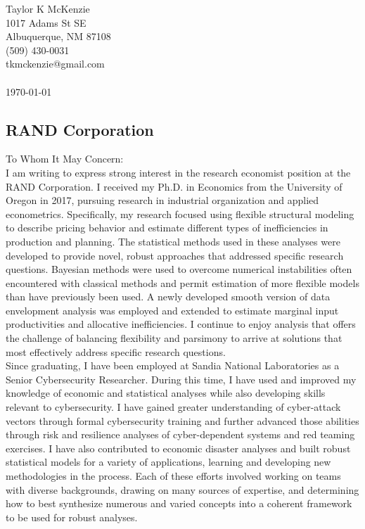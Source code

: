 \documentclass[]{article}
\begin{document}
\thispagestyle{empty}

\noindent Taylor K McKenzie\\1017 Adams St SE\\ Albuquerque, NM 87108\\ (509) 430-0031\\ tkmckenzie@gmail.com\\ \\
\today

\subsection*{RAND Corporation}

To Whom It May Concern: \\

I am writing to express strong interest in the research economist position at the RAND Corporation. I received my Ph.D. in Economics from the University of Oregon in 2017, pursuing research in industrial organization and applied econometrics. Specifically, my research focused using flexible structural modeling to describe pricing behavior and estimate different types of inefficiencies in production and planning. The statistical methods used in these analyses were developed to provide novel, robust approaches that addressed specific research questions. Bayesian methods were used to overcome numerical instabilities often encountered with classical methods and permit estimation of more flexible models than have previously been used. A newly developed smooth version of data envelopment analysis was employed and extended to estimate marginal input productivities and allocative inefficiencies. I continue to enjoy analysis that offers the challenge of balancing flexibility and parsimony to arrive at solutions that most effectively address specific research questions.\\

Since graduating, I have been employed at Sandia National Laboratories as a Senior Cybersecurity Researcher. During this time, I have used and improved my knowledge of economic and statistical analyses while also developing skills relevant to cybersecurity. I have gained greater understanding of cyber-attack vectors through formal cybersecurity training and further advanced those abilities through risk and resilience analyses of cyber-dependent systems and red teaming exercises. I have also contributed to economic disaster analyses and built robust statistical models for a variety of applications, learning and developing new methodologies in the process. Each of these efforts involved working on teams with diverse backgrounds, drawing on many sources of expertise, and determining how to best synthesize numerous and varied concepts into a coherent framework to be used for robust analyses.\\
\end{document}
